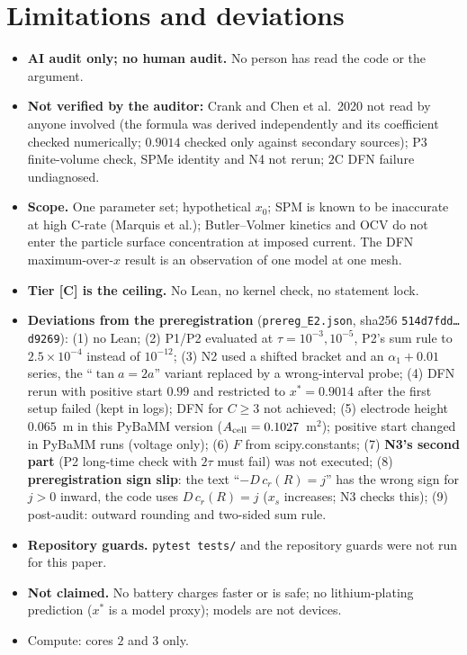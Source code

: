 \documentclass[10pt]{article}
\newcommand{\tier}[1]{\textsf{[#1]}}
\newcommand{\tC}{\tier{C}}
\begin{document}
\section{Limitations and deviations}\label{sec:lim}
\begin{itemize}\itemsep=1pt
\item \textbf{AI audit only; no human audit.} No person has read the code or the argument.
\item \textbf{Not verified by the auditor:} Crank and Chen et al.\ 2020 not read by anyone involved (the formula was derived independently and its coefficient checked numerically; $0.9014$ checked only against secondary sources); P3 finite-volume check, SPMe identity and N4 not rerun; $2$C DFN failure undiagnosed.
\item \textbf{Scope.} One parameter set; hypothetical $x_0$; SPM is known to be inaccurate at high C-rate (Marquis et al.); Butler--Volmer kinetics and OCV do not enter the particle surface concentration at imposed current. The DFN maximum-over-$x$ result is an observation of one model at one mesh.
\item \textbf{Tier \tC{} is the ceiling.} No Lean, no kernel check, no statement lock.
\item \textbf{Deviations from the preregistration} (\texttt{prereg\_E2.json}, sha256 \texttt{514d7fdd\dots d9269}): (1) no Lean; (2) P1/P2 evaluated at $\tau=10^{-3},10^{-5}$, P2's sum rule to $2.5\times10^{-4}$ instead of $10^{-12}$; (3) N2 used a shifted bracket and an $\alpha_1+0.01$ series, the ``$\tan a=2a$'' variant replaced by a wrong-interval probe; (4) DFN rerun with positive start $0.99$ and restricted to $x^*=0.9014$ after the first setup failed (kept in logs); DFN for $C\ge3$ not achieved; (5) electrode height $0.065$~m in this PyBaMM version ($A_{\rm cell}=0.1027$~m$^2$); positive start changed in PyBaMM runs (voltage only); (6) $F$ from scipy.constants; (7) \textbf{N3's second part} (P2 long-time check with $2\tau$ must fail) was not executed; (8) \textbf{preregistration sign slip}: the text ``$-D\,c_r(R)=j$'' has the wrong sign for $j>0$ inward, the code uses $D\,c_r(R)=j$ ($x_s$ increases; N3 checks this); (9) post-audit: outward rounding and two-sided sum rule.
\item \textbf{Repository guards.} \texttt{pytest tests/} and the repository guards were not run for this paper.
\item \textbf{Not claimed.} No battery charges faster or is safe; no lithium-plating prediction ($x^*$ is a model proxy); models are not devices.
\item Compute: cores $2$ and $3$ only.
\end{itemize}
\end{document}
